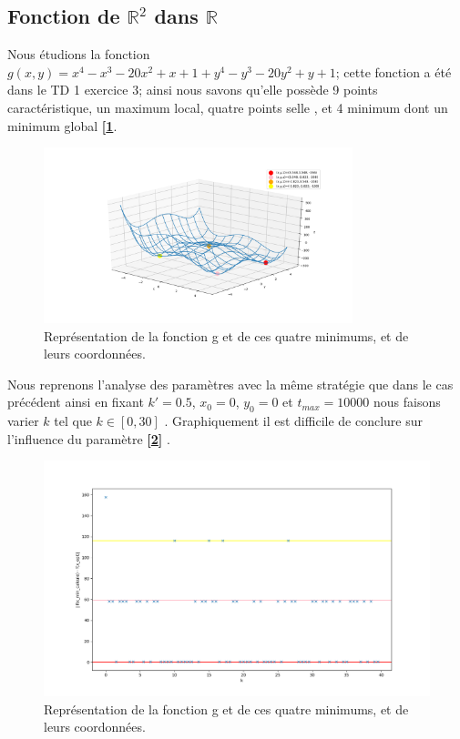 \documentclass[12pt]{article}
\begin{document}
\subsection{Fonction de $\mathbb{R}^2$ dans $\mathbb{R}$}
Nous étudions la fonction $g(x,y)= x^4-x^3-20x^2+x+1 +y^4-y^3-20y^2+y+1$; cette fonction a été dans le TD 1 exercice 3; ainsi nous savons qu'elle possède 9 points caractéristique, un maximum local, quatre points selle , et 4 minimum dont un minimum global \textbf{[\ref{Q21}}.
\begin{figure}[H]
\centering
\includegraphics[width=0.8\textwidth]{Q21.png}
\caption{Représentation de la fonction g et de ces quatre minimums, et de leurs coordonnées.}
\label{Q21}
\end{figure}

\begin{minipage}{0.5\textwidth}
Nous reprenons l'analyse des paramètres avec la même stratégie que dans le cas précédent ainsi en fixant $k'=0.5$, $x_0=0$, $y_0=0$ et $t_{max}=10000$ nous faisons varier $k$ tel que $k\in [0,30]$ . Graphiquement il est difficile de conclure sur l'influence du paramètre \textbf{[\ref{Q2K}]}
. 
\end{minipage} \hfill
\begin{minipage}{0.45\textwidth}
\begin{figure}[H]
\includegraphics[width=1\textwidth]{Q2K.png}
\caption{Représentation de la fonction g et de ces quatre minimums, et de leurs coordonnées.}
\label{Q2K}
\end{figure}
\end{minipage}
\end{document}
